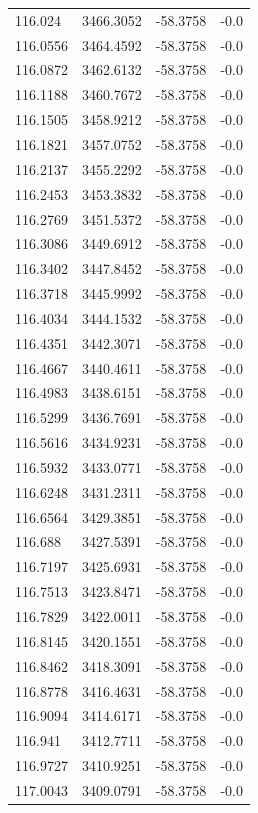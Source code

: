 \begin{table}[H]
\begin{tabular}{llll}
116.024 & 3466.3052 & -58.3758 & -0.0 \\
116.0556 & 3464.4592 & -58.3758 & -0.0 \\
116.0872 & 3462.6132 & -58.3758 & -0.0 \\
116.1188 & 3460.7672 & -58.3758 & -0.0 \\
116.1505 & 3458.9212 & -58.3758 & -0.0 \\
116.1821 & 3457.0752 & -58.3758 & -0.0 \\
116.2137 & 3455.2292 & -58.3758 & -0.0 \\
116.2453 & 3453.3832 & -58.3758 & -0.0 \\
116.2769 & 3451.5372 & -58.3758 & -0.0 \\
116.3086 & 3449.6912 & -58.3758 & -0.0 \\
116.3402 & 3447.8452 & -58.3758 & -0.0 \\
116.3718 & 3445.9992 & -58.3758 & -0.0 \\
116.4034 & 3444.1532 & -58.3758 & -0.0 \\
116.4351 & 3442.3071 & -58.3758 & -0.0 \\
116.4667 & 3440.4611 & -58.3758 & -0.0 \\
116.4983 & 3438.6151 & -58.3758 & -0.0 \\
116.5299 & 3436.7691 & -58.3758 & -0.0 \\
116.5616 & 3434.9231 & -58.3758 & -0.0 \\
116.5932 & 3433.0771 & -58.3758 & -0.0 \\
116.6248 & 3431.2311 & -58.3758 & -0.0 \\
116.6564 & 3429.3851 & -58.3758 & -0.0 \\
116.688 & 3427.5391 & -58.3758 & -0.0 \\
116.7197 & 3425.6931 & -58.3758 & -0.0 \\
116.7513 & 3423.8471 & -58.3758 & -0.0 \\
116.7829 & 3422.0011 & -58.3758 & -0.0 \\
116.8145 & 3420.1551 & -58.3758 & -0.0 \\
116.8462 & 3418.3091 & -58.3758 & -0.0 \\
116.8778 & 3416.4631 & -58.3758 & -0.0 \\
116.9094 & 3414.6171 & -58.3758 & -0.0 \\
116.941 & 3412.7711 & -58.3758 & -0.0 \\
116.9727 & 3410.9251 & -58.3758 & -0.0 \\
117.0043 & 3409.0791 & -58.3758 & -0.0 \\

\end{tabular}
\end{table}
